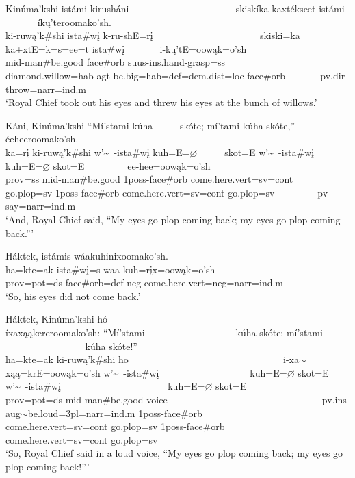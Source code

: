 \begin{exe}
\item\label{EJ67} \glll Kinúma'kshi istámi kirusháni ~ ~ ~ ~ ~ ~ ~ ~ ~ ~ ~ ~ ~ skiskíka kaxtékseet istámi ~ ~ ~ ~ íkų'teroomako'sh.\\
ki-ruwą'k\#shi ista\#wį k-ru-shE=rį ~ ~ ~ ~ ~ ~ ~ ~ ~ ~ ~ ~ ~ skiski=ka ka+xtE=k=s=ee=t ista\#wį ~ ~ ~ ~ i-kų'tE=oowąk=o'sh\\
mid-\textnormal{man}\#\textnormal{be.good} \textnormal{face}\#\textnormal{orb} suus-ins.hand-\textnormal{grasp}=ss ~ ~ ~ ~ ~ ~ ~ ~ ~ ~ ~ ~ ~ \textnormal{diamond.willow}=hab agt-\textnormal{be.big}=hab=def=dem.dist=loc \textnormal{face}\#\textnormal{orb} ~ ~ ~ ~ pv.dir-\textnormal{throw}=narr=ind.m\\
\glt `Royal Chief took out his eyes and threw his eyes at the bunch of willows.'

\item\label{EJ68} \glll Káni, Kinúma'kshi ``Mí'stami kúha ~ ~ ~ skóte; mí'tami kúha skóte,'' ~ ~ ~ ~ ~ éeheeroomako'sh.\\
ka=rį ki-ruwą'k\#shi w'\~~-ista\#wį kuh=E=$\varnothing$ ~ ~ ~ skot=E w'\~~-ista\#wį kuh=E=$\varnothing$ skot=E ~ ~ ~ ~ ~ ee-hee=oowąk=o'sh\\
prov=ss mid-\textnormal{man}\#\textnormal{be.good} 1poss-\textnormal{face}\#\textnormal{orb} \textnormal{come.here}.vert=sv=cont ~ ~ ~ \textnormal{go.plop}=sv 1poss-\textnormal{face}\#\textnormal{orb} \textnormal{come.here}.vert=sv=cont \textnormal{go.plop}=sv ~ ~ ~ ~ ~ pv-\textnormal{say}=narr=ind.m\\
\glt `And, Royal Chief said, ``My eyes go plop coming back; my eyes go plop coming back.{''}'

\item\label{EJ69} \glll Háktek, istámis wáakuhinixoomako'sh.\\
ha=kte=ak ista\#wį=s waa-kuh=rįx=oowąk=o'sh\\
prov=pot=ds \textnormal{face}\#\textnormal{orb}=def neg-\textnormal{come.here}.vert=neg=narr=ind.m\\
\glt `So, his eyes did not come back.'

\item\label{EJ70} \glll Háktek, Kinúma'kshi hó ~ ~ ~ ~ ~ ~ ~ ~ ~ ~ ~ ~ ~ ~ ~ ~ ~ ~ ~ íxaxąąkereroomako'sh: ``Mí'stami ~ ~ ~ ~ ~ ~ ~ ~ ~ ~ ~ kúha skóte; mí'stami ~ ~ ~ ~ ~ ~ ~ ~ ~ ~ ~ ~ ~ kúha skóte!''\\
ha=kte=ak ki-ruwą'k\#shi ho ~ ~ ~ ~ ~ ~ ~ ~ ~ ~ ~ ~ ~ ~ ~ ~ ~ ~ ~ i-xa$\sim$xąą=krE=oowąk=o'sh w'\~~-ista\#wį ~ ~ ~ ~ ~ ~ ~ ~ ~ ~ ~ kuh=E=$\varnothing$ skot=E w'\~~-ista\#wį ~ ~ ~ ~ ~ ~ ~ ~ ~ ~ ~ ~ ~  kuh=E=$\varnothing$ skot=E\\
prov=pot=ds mid-\textnormal{man}\#\textnormal{be.good} \textnormal{voice} ~ ~ ~ ~ ~ ~ ~ ~ ~ ~ ~ ~ ~ ~ ~ ~ ~ ~ ~ pv.ins-aug$\sim$\textnormal{be.loud}=3pl=narr=ind.m 1poss-\textnormal{face}\#\textnormal{orb} ~ ~ ~ ~ ~ ~ ~ ~ ~ ~ ~ \textnormal{come.here}.vert=sv=cont \textnormal{go.plop}=sv 1poss-\textnormal{face}\#\textnormal{orb} ~ ~ ~ ~ ~ ~ ~ ~ ~ ~ ~ ~ ~  \textnormal{come.here}.vert=sv=cont \textnormal{go.plop}=sv\\
\glt `So, Royal Chief said in a loud voice, ``My eyes go plop coming back; my eyes go plop coming back!{''}'


\end{exe}

